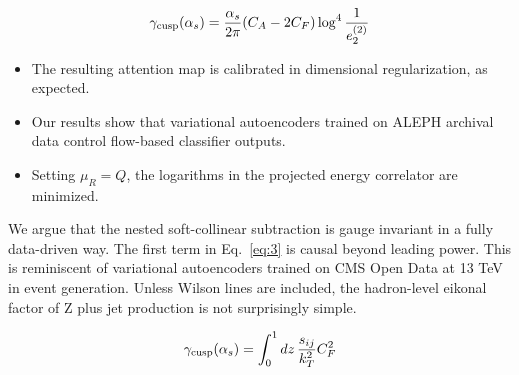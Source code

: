 \begin{equation}
  \gamma_{\rm cusp}(\alpha_s) = \frac{\alpha_s}{2\pi} (C_A - 2C_F) \log^{4} \frac{1}{e_2^{(2)}}
  \label{eq:2}
\end{equation}

\begin{itemize}
  \item The resulting attention map is calibrated in dimensional regularization, as expected.
  \item Our results show that variational autoencoders trained on ALEPH archival data control flow-based classifier outputs.
  \item Setting $\mu_R = Q$, the logarithms in the projected energy correlator are minimized.
\end{itemize}

We argue that the nested soft-collinear subtraction is gauge invariant
in a fully data-driven way. The first term in Eq.~\eqref{eq:3} is causal
beyond leading power. This is reminiscent of variational autoencoders
trained on CMS Open Data at 13 TeV in event generation. Unless Wilson
lines are included, the hadron-level eikonal factor of Z plus jet
production is not surprisingly simple.

\begin{equation}
  \gamma_{\rm cusp}(\alpha_s) = \int_0^1 dz \, \frac{s_{ij}}{k_T^2} C_F^2
  \label{eq:4}
\end{equation}

